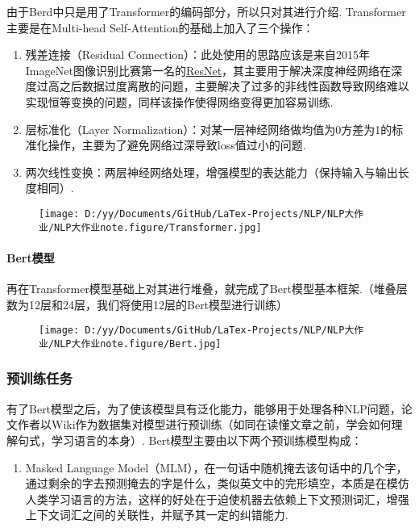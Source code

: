 \documentclass[
]{article}
\begin{document}
由于Berd中只是用了Transformer的编码部分，所以只对其进行介绍.
Transformer主要是在Multi-head Self-Attention的基础上加入了三个操作：

\begin{enumerate}
\def\labelenumi{\arabic{enumi}.}
\item
  残差连接（Residual
  Connection）：此处使用的思路应该是来自2015年ImageNet图像识别比赛第一名的\href{https://arxiv.org/abs/1512.03385}{ResNet}，其主要用于解决深度神经网络在深度过高之后数据过度离散的问题，主要解决了过多的非线性函数导致网络难以实现恒等变换的问题，同样该操作使得网络变得更加容易训练.
\item
  层标准化（Layer
  Normalization）：对某一层神经网络做均值为0方差为1的标准化操作，主要为了避免网络过深导致loss值过小的问题.
\item
  两次线性变换：两层神经网络处理，增强模型的表达能力（保持输入与输出长度相同）.
\end{enumerate}

\begin{figure}
\centering
\texttt{[image: D:/yy/Documents/GitHub/LaTex-Projects/NLP/NLP大作业/NLP大作业note.figure/Transformer.jpg]}
\caption{}
\end{figure}

\hypertarget{bertux6a21ux578b-2}{%
\paragraph{Bert模型}\label{bertux6a21ux578b-2}}

再在Transformer模型基础上对其进行堆叠，就完成了Bert模型基本框架.（堆叠层数为12层和24层，我们将使用12层的Bert模型进行训练）

\begin{figure}
\centering
\texttt{[image: D:/yy/Documents/GitHub/LaTex-Projects/NLP/NLP大作业/NLP大作业note.figure/Bert.jpg]}
\caption{}
\end{figure}

\hypertarget{ux9884ux8badux7ec3ux4efbux52a1}{%
\subsubsection{预训练任务}\label{ux9884ux8badux7ec3ux4efbux52a1}}

有了Bert模型之后，为了使该模型具有泛化能力，能够用于处理各种NLP问题，论文作者以Wiki作为数据集对模型进行预训练（如同在读懂文章之前，学会如何理解句式，学习语言的本身）.
Bert模型主要由以下两个预训练模型构成：

\begin{enumerate}
\def\labelenumi{\arabic{enumi}.}
\item
  Masked Language
  Model（MLM），在一句话中随机掩去该句话中的几个字，通过剩余的字去预测掩去的字是什么，类似英文中的完形填空，本质是在模仿人类学习语言的方法，这样的好处在于迫使机器去依赖上下文预测词汇，增强上下文词汇之间的关联性，并赋予其一定的纠错能力.
\end{enumerate}
\end{document}
